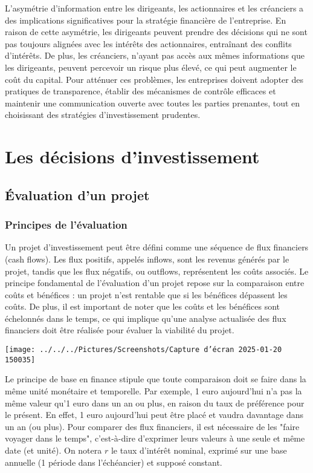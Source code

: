 \documentclass[a4paper, 12pt]{report}
\begin{document}
L'asymétrie d'information entre les dirigeants, les actionnaires et les créanciers a des implications significatives pour la stratégie financière de l'entreprise. En raison de cette asymétrie, les dirigeants peuvent prendre des décisions qui ne sont pas toujours alignées avec les intérêts des actionnaires, entraînant des conflits d'intérêts. De plus, les créanciers, n'ayant pas accès aux mêmes informations que les dirigeants, peuvent percevoir un risque plus élevé, ce qui peut augmenter le coût du capital. Pour atténuer ces problèmes, les entreprises doivent adopter des pratiques de transparence, établir des mécanismes de contrôle efficaces et maintenir une communication ouverte avec toutes les parties prenantes, tout en choisissant des stratégies d'investissement prudentes.

\part{Les décisions d'investissement}
\pagestyle{empty} 
\chapter{Évaluation d'un projet}

\section{Principes de l'évaluation}

Un projet d'investissement peut être défini comme une séquence de flux financiers (cash flows). Les flux positifs, appelés inflows, sont les revenus générés par le projet, tandis que les flux négatifs, ou outflows, représentent les coûts associés. Le principe fondamental de l'évaluation d'un projet repose sur la comparaison entre coûts et bénéfices : un projet n'est rentable que si les bénéfices dépassent les coûts. De plus, il est important de noter que les coûts et les bénéfices sont échelonnés dans le temps, ce qui implique qu'une analyse actualisée des flux financiers doit être réalisée pour évaluer la viabilité du projet.

\begin{center}
	\texttt{[image: ../../../Pictures/Screenshots/Capture d'écran 2025-01-20 150035]}
\end{center}

Le principe de base en finance stipule que toute comparaison doit se faire dans la même unité monétaire et temporelle. Par exemple, 1 euro aujourd'hui n'a pas la même valeur qu'1 euro dans un an ou plus, en raison du taux de préférence pour le présent. En effet, 1 euro aujourd'hui peut être placé et vaudra davantage dans un an (ou plus). Pour comparer des flux financiers, il est nécessaire de les "faire voyager dans le temps", c'est-à-dire d'exprimer leurs valeurs à une seule et même date (et unité). On notera \( r \) le taux d'intérêt nominal, exprimé sur une base annuelle (1 période dans l'échéancier) et supposé constant.
\end{document}
